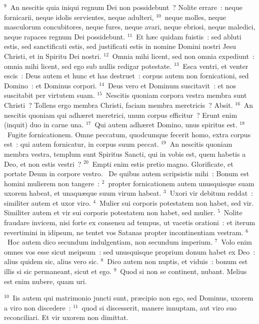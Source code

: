 ${}^{9}$~An nescitis quia iniqui regnum Dei non possidebunt~? Nolite errare~: neque fornicarii, neque idolis servientes, neque adulteri,
${}^{10}$~neque molles, neque masculorum concubitores, neque fures, neque avari, neque ebriosi, neque maledici, neque rapaces regnum Dei possidebunt.
${}^{11}$~Et h\ae c quidam fuistis~: sed abluti estis, sed sanctificati estis, sed justificati estis in nomine Domini nostri Jesu Christi, et in Spiritu Dei nostri.
${}^{12}$~Omnia mihi licent, sed non omnia expediunt~: omnia mihi licent, sed ego sub nullis redigar potestate.
${}^{13}$~Esca ventri, et venter escis~: Deus autem et hunc et has destruet~: corpus autem non fornicationi, sed Domino~: et Dominus corpori.
${}^{14}$~Deus vero et Dominum suscitavit~: et nos suscitabit per virtutem suam.
${}^{15}$~Nescitis quoniam corpora vestra membra sunt Christi~? Tollens ergo membra Christi, faciam membra meretricis~? Absit.
${}^{16}$~An nescitis quoniam qui adh\ae ret meretrici, unum corpus efficitur~? Erunt enim (inquit) duo in carne una.
${}^{17}$~Qui autem adh\ae ret Domino, unus spiritus est.
${}^{18}$~Fugite fornicationem. Omne peccatum, quodcumque fecerit homo, extra corpus est~: qui autem fornicatur, in corpus suum peccat.
${}^{19}$~An nescitis quoniam membra vestra, templum sunt Spiritus Sancti, qui in vobis est, quem habetis a Deo, et non estis vestri~?
${}^{20}$~Empti enim estis pretio magno. Glorificate, et portate Deum in corpore vestro.
~De quibus autem scripsistis mihi~: Bonum est homini mulierem non tangere~:
${}^{2}$~propter fornicationem autem unusquisque suam uxorem habeat, et unaqu\ae que suum virum habeat.
${}^{3}$~Uxori vir debitum reddat~: similiter autem et uxor viro.
${}^{4}$~Mulier sui corporis potestatem non habet, sed vir. Similiter autem et vir sui corporis potestatem non habet, sed mulier.
${}^{5}$~Nolite fraudare invicem, nisi forte ex consensu ad tempus, ut vacetis orationi~: et iterum revertimini in idipsum, ne tentet vos Satanas propter incontinentiam vestram.
${}^{6}$~Hoc autem dico secundum indulgentiam, non secundum imperium.
${}^{7}$~Volo enim omnes vos esse sicut meipsum~: sed unusquisque proprium donum habet ex Deo~: alius quidem sic, alius vero sic.
${}^{8}$~Dico autem non nuptis, et viduis~: bonum est illis si sic permaneant, sicut et ego.
${}^{9}$~Quod si non se continent, nubant. Melius est enim nubere, quam uri.


${}^{10}$~Iis autem qui matrimonio juncti sunt, pr\ae cipio non ego, sed Dominus, uxorem a viro non discedere~:
${}^{11}$~quod si discesserit, manere innuptam, aut viro suo reconciliari. Et vir uxorem non dimittat.


